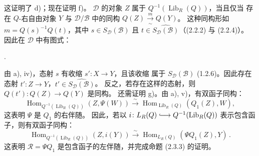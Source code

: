 \clearpage
{}%
\begingroup
\small
\setlength{\parskip}{0pt}%
\setlength{\emergencystretch}{1.5em}%
\setlength{\abovedisplayskip}{3pt plus 1pt minus 1pt}%
\setlength{\belowdisplayskip}{3pt plus 1pt minus 1pt}%

\noindent 这证明了 d)；现在证明 f)。
$\mathcal D$ 的对象 $Z$ 属于 $Q^{-1}(\operatorname{Lib}_R(Q))$，当且仅当
存在 $Q$-右自由对象 $Y$ 与 $\mathcal D/\mathcal B$ 中的同构
$Q(Z)\xrightarrow[\sim]{m}Q(Y)$。
这种同构形如 $m=Q(s)^{-1}Q(t)$，其中
$s\in S_{\mathcal D}(\mathcal B)$ 且
$t\in\widehat{S_{\mathcal D}(\mathcal B)}$（(2.2.2) 与 (2.2.4)）。
因此在 $\mathcal D$ 中有图式：
\begin{center}
  \quad .
\end{center}
由 a), iv)，态射 $s$ 有收缩 $s'\colon X\longrightarrow Y$，且该收缩
属于 $S_{\mathcal D}(\mathcal B)$ (1.2.6)。因此存在态射
$t'\colon Z\longrightarrow Y$，$t'\in\widehat{S_{\mathcal D}(\mathcal B)}$。
反之，若存在这样的态射，则 $Q(t')\colon Q(Z)\longrightarrow Q(Y)$ 是同构。
还需证明 g)。由 a), v)，有双函子同构：
\[
 \operatorname{Hom}_{Q^{-1}(\operatorname{Lib}_R(Q))}(Z,\Psi(W))
 \xrightarrow{\sim}
 \operatorname{Hom}_{\operatorname{Lib}_R(Q)}(Q_1(Z),W),
\]
这表明 $\Psi$ 是 $Q_1$ 的右伴随。
因此，若以 $i\colon L_R(Q)\lhook\joinrel\longrightarrow
Q^{-1}(\operatorname{Lib}_R(Q))$ 表示包含函子，则有双函子同构：
\[
 \operatorname{Hom}_{Q^{-1}(\operatorname{Lib}_R(Q))}(Z,i(Y))
 \xrightarrow{\sim}
 \operatorname{Hom}_{L_R(Q)}(\Psi Q_1(Z),Y)\, .
\]
这表明 $\mathcal R=\Psi Q_1$ 是包含函子的左伴随，并完成命题 (2.3.3)
的证明。

